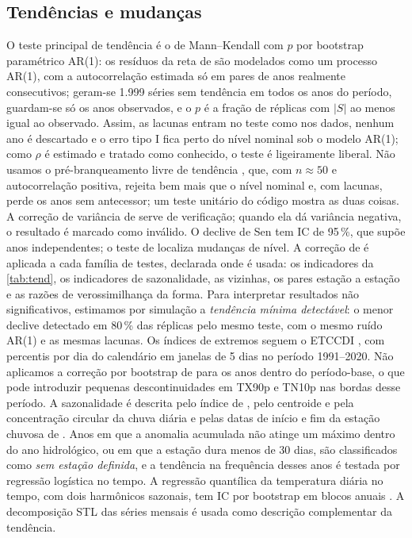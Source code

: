 \documentclass[11pt,a4paper]{article}
\begin{document}
\subsection{Tendências e mudanças}
O teste principal de tendência é o de Mann--Kendall \parencite{mann1945,kendall1975} com $p$ por
bootstrap paramétrico AR(1): os resíduos da reta de \textcite{sen1968} são modelados como um processo
AR(1), com a autocorrelação estimada só em pares de anos realmente consecutivos; geram-se 1.999 séries
sem tendência em todos os anos do período, guardam-se só os anos observados, e o $p$ é a fração de
réplicas com $|S|$ ao menos igual ao observado. Assim, as lacunas entram no teste como nos dados,
nenhum ano é descartado e o erro tipo I fica perto do nível nominal sob o modelo AR(1); como $\rho$ é
estimado e tratado como conhecido, o teste é ligeiramente liberal. Não usamos o
pré-branqueamento livre de tendência \parencite[TFPW;][]{yue2002}, que, com $n \approx 50$ e
autocorrelação positiva, rejeita bem mais que o nível nominal e, com lacunas, perde os anos sem
antecessor; um teste unitário do código mostra as duas coisas. A correção de variância de
\textcite{hamed1998} serve de verificação; quando ela dá variância negativa, o resultado é marcado
como inválido. O declive de Sen tem IC de 95\,\%, que supõe anos independentes; o teste de
\textcite{pettitt1979} localiza mudanças de nível. A correção de \textcite{benjamini1995} é aplicada a
cada família de testes, declarada onde é usada: os indicadores da \cref{tab:tend}, os indicadores de
sazonalidade, as vizinhas, os pares estação a estação e as razões de verossimilhança da forma. Para
interpretar resultados não significativos, estimamos por simulação a \emph{tendência mínima
detectável}: o menor declive detectado em 80\,\% das réplicas pelo mesmo teste, com o mesmo ruído
AR(1) e as mesmas lacunas. Os índices de
extremos seguem o ETCCDI \parencite{zhang2011}, com percentis por dia do calendário em janelas
de 5 dias no período 1991--2020. Não aplicamos a correção por bootstrap de \textcite{zhang2005}
para os anos dentro do período-base, o que pode introduzir pequenas descontinuidades em TX90p e
TN10p nas bordas desse período. A sazonalidade é descrita pelo índice de \textcite{walsh1981},
pelo centroide e pela concentração circular da chuva diária e pelas datas de início e fim da
estação chuvosa de \textcite{liebmann2007}. Anos em que a anomalia acumulada não atinge um máximo
dentro do ano hidrológico, ou em que a estação dura menos de 30 dias, são classificados como
\emph{sem estação definida}, e a tendência na
frequência desses anos é testada por regressão logística no tempo. A regressão quantílica
\parencite{koenker1978} da temperatura diária no tempo, com dois harmônicos sazonais, tem IC por
bootstrap em blocos anuais \parencite{kunsch1989}. A decomposição STL \parencite{cleveland1990}
das séries mensais é usada como descrição complementar da tendência.
\end{document}
